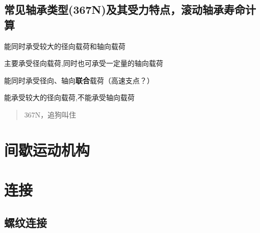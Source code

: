 \documentclass[twocolumn]{ctexart}
\begin{document}
\subsection{常见轴承类型(367N)及其受力特点，滚动轴承寿命计算}
\begin{description}[leftmargin=2.8cm,style=nextline,nosep]%
  \item[3 圆锥滚子轴承] 能同时承受较大的径向载荷和轴向载荷
  \item[6 深沟球轴承] 主要承受径向载荷,同时也可承受一定量的轴向载荷
  \item[7 角接触球轴承] 能同时承受径向、轴向\textbf{联合}载荷（高速支点？）
  \item[N 圆柱滚子轴承]  能承受较大的径向载荷,不能承受轴向载荷
\end{description}
\begin{quote}
{\qquad{}\ccwd\kaishu{}
367N，追狗叫住
}
\end{quote}
\section{间歇运动机构}
\section{连接}
\subsection{螺纹连接}
\end{document}
